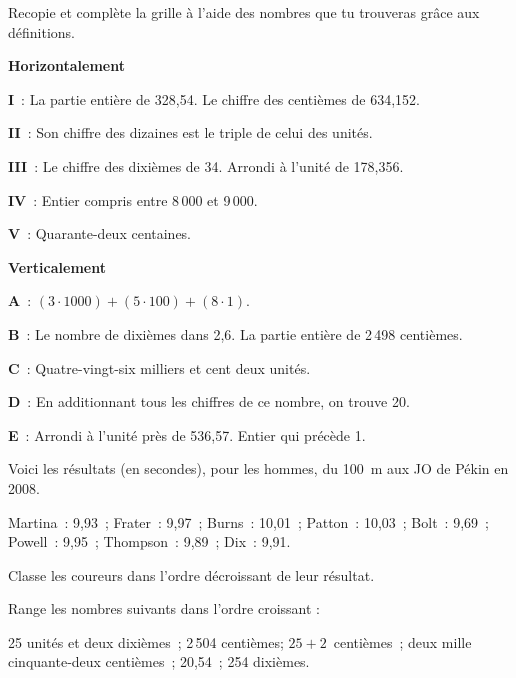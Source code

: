 \begin{exercice}
Recopie et complète la grille à l'aide des nombres que tu trouveras grâce aux définitions.

\vspace{0.75em}

\textbf{Horizontalement}

\textbf{I} : La partie entière de 328,54. Le chiffre des centièmes de 634,152.

\textbf{II} : Son chiffre des dizaines est le triple de celui des unités.

\textbf{III} : Le chiffre des dixièmes de 34. Arrondi à l'unité de 178,356.

\textbf{IV} : Entier compris entre 8\,000 et 9\,000.

\textbf{V} : Quarante-deux centaines.

\vspace{0.75em}

\textbf{Verticalement}

\textbf{A} : $(3 \cdot 1 000) + (5 \cdot 100) + (8 \cdot 1)$.

\textbf{B} : Le nombre de dixièmes dans 2,6. La partie entière de 2\,498 centièmes.

\textbf{C} : Quatre-vingt-six milliers et cent deux unités.

\textbf{D} : En additionnant tous les chiffres de ce nombre, on trouve 20.

\textbf{E} : Arrondi à l'unité près de 536,57. Entier qui précède 1.

\end{exercice}


\begin{exercice}%
Voici les résultats (en secondes), pour les hommes, du 100 m aux JO de Pékin en 2008. \vspace{0.75em}

Martina : 9,93 ; Frater : 9,97 ; Burns : 10,01 ; Patton : 10,03 ; Bolt : 9,69 ; Powell : 9,95 ; Thompson : 9,89 ; Dix : 9,91.\vspace{0.75em}

Classe les coureurs dans l'ordre décroissant de leur résultat.
\end{exercice}


\begin{exercice}[À ordonner]
Range les nombres suivants dans l'ordre croissant : \vspace{0.75em}

25 unités et deux dixièmes ; 2\,504 centièmes; $25 + 2$ centièmes ; deux mille cinquante‑deux centièmes ; 20,54 ; 254 dixièmes.
\end{exercice}


